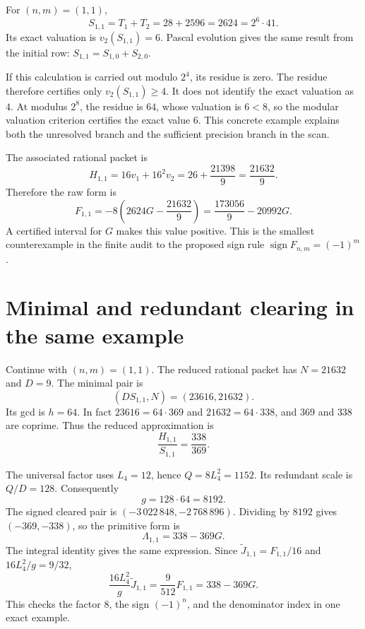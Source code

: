 For $(n,m)=(1,1)$,
\begin{equation*}
 S_{1,1}=T_1+T_2=28+2596=2624=2^6\cdot41.
\end{equation*}
Its exact valuation is $v_2(S_{1,1})=6$. Pascal evolution gives the same result from the initial row: $S_{1,1}=S_{1,0}+S_{2,0}$.

If this calculation is carried out modulo $2^4$, its residue is zero. The residue therefore certifies only $v_2(S_{1,1})\geq4$. It does not identify the exact valuation as $4$. At modulus $2^8$, the residue is $64$, whose valuation is $6<8$, so the modular valuation criterion certifies the exact value $6$. This concrete example explains both the unresolved branch and the sufficient precision branch in the scan.

The associated rational packet is
\begin{equation*}
 H_{1,1}=16v_1+16^2v_2
 =26+\frac{21398}{9}
 =\frac{21632}{9}.
\end{equation*}
Therefore the raw form is
\begin{equation*}
 F_{1,1}=-8\left(2624G-\frac{21632}{9}\right)
 =\frac{173056}{9}-20992G.
\end{equation*}
A certified interval for $G$ makes this value positive. This is the smallest counterexample in the finite audit to the proposed sign rule $\operatorname{sign}F_{n,m}=(-1)^m$.

\section{Minimal and redundant clearing in the same example}

Continue with $(n,m)=(1,1)$. The reduced rational packet has $N=21632$ and $D=9$. The minimal pair is
\begin{equation*}
 (DS_{1,1},N)=(23616,21632).
\end{equation*}
Its gcd is $h=64$. In fact $23616=64\cdot369$ and $21632=64\cdot338$, and $369$ and $338$ are coprime. Thus the reduced approximation is
\begin{equation*}
 \frac{H_{1,1}}{S_{1,1}}=\frac{338}{369}.
\end{equation*}

The universal factor uses $L_4=12$, hence $Q=8L_4^2=1152$. Its redundant scale is $Q/D=128$. Consequently
\begin{equation*}
 g=128\cdot64=8192.
\end{equation*}
The signed cleared pair is $(-3\,022\,848,-2\,768\,896)$. Dividing by $8192$ gives $(-369,-338)$, so the primitive form is
\begin{equation}
 \Lambda_{1,1}=338-369G.
 \label{eq:app-small-primitive}
\end{equation}
The integral identity gives the same expression. Since $\widetilde J_{1,1}=F_{1,1}/16$ and $16L_4^2/g=9/32$,
\begin{equation*}
 \frac{16L_4^2}{g}\widetilde J_{1,1}
 =\frac9{512}F_{1,1}=338-369G.
\end{equation*}
This checks the factor $8$, the sign $(-1)^n$, and the denominator index in one exact example.

